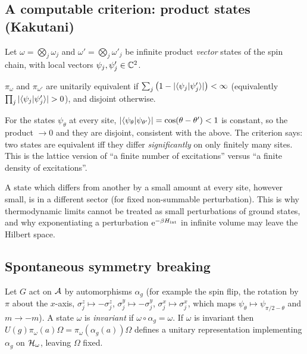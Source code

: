 \subsection{A computable criterion: product states (Kakutani)}

Let $\omega=\bigotimes_j\omega_j$ and $\omega'=\bigotimes_j\omega'_j$ be infinite product \emph{vector} states of the spin chain, with local vectors $\psi_j,\psi_j'\in\mathbb{C}^2$.

\begin{theorem}[Kakutani]
$\pi_\omega$ and $\pi_{\omega'}$ are unitarily equivalent if $\sum_j\big(1-|\langle \psi_j\vert \psi_j'\rangle|\big)<\infty$ (equivalently $\prod_j|\braket{\psi_j}{\psi'_j}|>0$), and disjoint otherwise.
\end{theorem}
For the states $\psi_\theta$ at every site, $|\langle \psi_\theta\vert \psi_{\theta'}\rangle|=\cos(\theta-\theta')<1$ is constant, so the product $\to0$ and they are disjoint, consistent with the above. The criterion says: two states are equivalent iff they differ \emph{significantly} on only finitely many sites. This is the lattice version of ``a finite number of excitations'' versus ``a finite density of excitations''.

\begin{whatwrong}
A state which differs from another by a small amount at every site, however small, is in a different sector (for fixed non-summable perturbation). This is why thermodynamic limits cannot be treated as small perturbations of ground states, and why exponentiating a perturbation $\mathrm{e}^{-\beta H_{\rm int}}$ in infinite volume may leave the Hilbert space.
\end{whatwrong}

\subsection{Spontaneous symmetry breaking}

Let $G$ act on $\mathcal{A}$ by automorphisms $\alpha_g$ (for example the spin flip, the rotation by $\pi$ about the $x$-axis, $\sigma^z_j\mapsto-\sigma^z_j$, $\sigma^y_j\mapsto-\sigma^y_j$, $\sigma^x_j\mapsto\sigma^x_j$, which maps $\psi_\theta\mapsto\psi_{\pi/2-\theta}$ and $m\to-m$). A state $\omega$ is \emph{invariant} if $\omega\circ\alpha_g=\omega$. If $\omega$ is invariant then $U(g)\pi_\omega(a)\Omega=\pi_\omega(\alpha_g(a))\Omega$ defines a unitary representation implementing $\alpha_g$ on $\mathcal{H}_\omega$, leaving $\Omega$ fixed.

